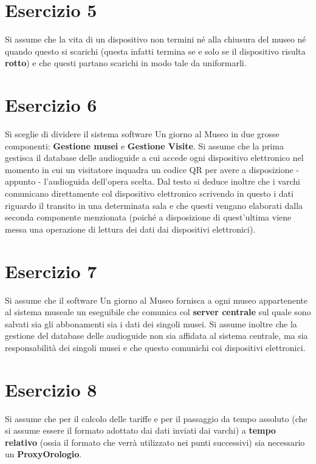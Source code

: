 \documentclass[10pt, italian, openany, landscape]{book}
\newcommand*{\MyIncludeGraphics}[2][]{%
\begin{adjustbox}{max size={0.8\textwidth}{\textheight}}
    \texttt{[image: \#2]}%
\end{adjustbox}
}
\begin{document}

\pagebreak

\section{Esercizio 5}
Si assume che la vita di un dispositivo non termini n\'e alla chiusura del museo n\'e quando questo si scarichi
(questa infatti termina se e solo se il dispositivo risulta \textbf{rotto}) e che questi partano scarichi in modo tale
da uniformarli.

\pagebreak

\section{Esercizio 6}
Si sceglie di dividere il sistema software Un giorno al Museo in due grosse componenti: \textbf{Gestione musei} e 
\textbf{Gestione Visite}. Si assume che la prima gestisca il database delle audioguide a cui accede ogni dispositivo
elettronico nel momento in cui un visitatore inquadra un codice QR per avere a disposizione - appunto - l'audioguida
dell'opera scelta. Dal testo si deduce inoltre che i varchi comunicano direttamente col dispositivo elettronico scrivendo in
questo i dati riguardo il transito in una determinata sala e che questi vengano elaborati dalla seconda componente menzionata
(poich\'e a disposizione di quest'ultima viene messa una operazione di lettura dei dati dai dispositivi elettronici).


\pagebreak

\section{Esercizio 7}
Si assume che il software Un giorno al Museo fornisca a ogni museo appartenente al sistema museale un eseguibile
che comunica col \textbf{server centrale} sul quale sono salvati sia gli abbonamenti sia i dati dei singoli musei. Si assume inoltre
che la gestione del database delle audioguide non sia affidata al sistema centrale, ma sia responsabilit\`a dei
singoli musei e che questo comunichi coi dispositivi elettronici.


\pagebreak

\section{Esercizio 8}
Si assume che per il calcolo delle tariffe e per il passaggio da
tempo assoluto (che si assume essere il formato adottato dai dati inviati dai varchi)
a \textbf{tempo relativo} (ossia il formato che verr\`a utilizzato nei punti successivi)
sia necessario un \textbf{ProxyOrologio}.
\end{document}
